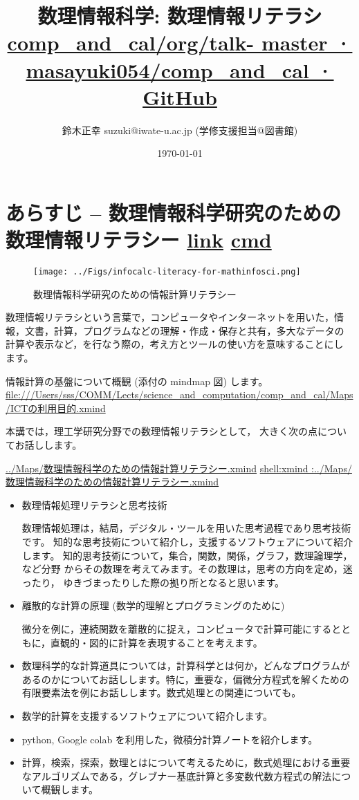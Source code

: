 \documentclass[dvipdfmx,11pat]{jarticle}
\author{鈴木正幸 suzuki@iwate-u.ac.jp (学修支援担当@図書館)}
\date{\today}
\title{ 数理情報科学: 数理情報リテラシ \href{https://github.com/masayuki054/comp\_and\_cal/tree/master/talk-2024}{comp\_and\_cal/org/talk- master · masayuki054/comp\_and\_cal · GitHub}}
\begin{document}
\maketitle
\tableofcontents

\section{あらすじ -- 数理情報科学研究のための数理情報リテラシー \href{../Maps/数理情報科学のための情報計算リテラシー.xmind}{link} \href{shell:xmind ../Maps/数理情報科学のための情報計算リテラシー.xmind}{cmd}}
\label{sec:orgd4c5880}
\begin{figure}[htbp]
\centering
\texttt{[image: ../Figs/infocalc-literacy-for-mathinfosci.png]}
\caption{数理情報科学研究のための情報計算リテラシー}
\end{figure}

数理情報リテラシという言葉で，コンピュータやインターネットを用いた，情
報，文書，計算，プログラムなどの理解・作成・保存と共有，多大なデータの
計算や表示など，を行なう際の，考え方とツールの使い方を意味することにし
ます。

情報計算の基盤について概観 (添付の mindmap 図) します。
\url{file:///Users/sss/COMM/Lects/science\_and\_computation/comp\_and\_cal/Maps/ICTの利用目的.xmind}


本講では，理工学研究分野での数理情報リテラシとして，
大きく次の点についてお話しします。

\url{../Maps/数理情報科学のための情報計算リテラシー.xmind}
\url{shell:xmind :../Maps/数理情報科学のための情報計算リテラシー.xmind}

\begin{itemize}
\item 数理情報処理リテラシと思考技術

数理情報処理は，結局，デジタル・ツールを用いた思考過程であり思考技術です。
知的な思考技術について紹介し，支援するソフトウェアについて紹介します。
知的思考技術について，集合，関数，関係，グラフ，数理論理学，など分野
からその数理を考えてみます。その数理は，思考の方向を定め，迷ったり，
ゆきづまったりした際の拠り所となると思います。

\item 離散的な計算の原理 (数学的理解とプログラミングのために)

微分を例に，連続関数を離散的に捉え，コンピュータで計算可能にするとと
もに，直観的・図的に計算を表現することを考えます。

\item 数理科学的な計算道具については，計算科学とは何か，どんなプログラムが
あるのかについてお話しします。特に，重要な，偏微分方程式を解くための
有限要素法を例にお話しします。数式処理との関連についても。

\item 数学的計算を支援するソフトウェアについて紹介します。

\item python, Google colab を利用した，微積分計算ノートを紹介します。

\item 計算，検索，探索，数理とはについて考えるために，数式処理における重要
なアルゴリズムである，グレブナー基底計算と多変数代数方程式の解法につ
いて概観します。
\end{itemize}
\end{document}
